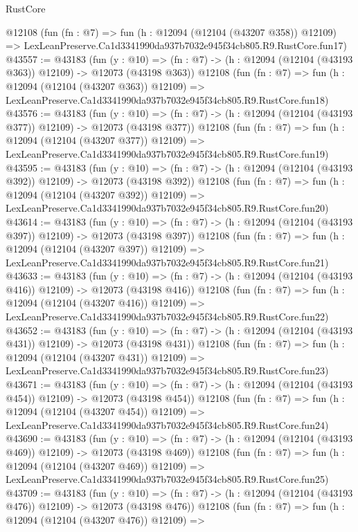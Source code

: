 \begin{lexlean}{RustCore}
\begin{coremodule}
    @12108
    (fun (fn : @7) =>
    fun (h : @12094 (@12104 (@43207 @358)) @12109) =>
    LexLeanPreserve.Ca1d3341990da937b7032e945f34cb805.R9.RustCore.fun17)
@43557 := @43183
    (fun (y : @10) =>
    (fn : @7) -> (h : @12094 (@12104 (@43193 @363)) @12109) -> @12073 (@43198 @363))
    @12108
    (fun (fn : @7) =>
    fun (h : @12094 (@12104 (@43207 @363)) @12109) =>
    LexLeanPreserve.Ca1d3341990da937b7032e945f34cb805.R9.RustCore.fun18)
@43576 := @43183
    (fun (y : @10) =>
    (fn : @7) -> (h : @12094 (@12104 (@43193 @377)) @12109) -> @12073 (@43198 @377))
    @12108
    (fun (fn : @7) =>
    fun (h : @12094 (@12104 (@43207 @377)) @12109) =>
    LexLeanPreserve.Ca1d3341990da937b7032e945f34cb805.R9.RustCore.fun19)
@43595 := @43183
    (fun (y : @10) =>
    (fn : @7) -> (h : @12094 (@12104 (@43193 @392)) @12109) -> @12073 (@43198 @392))
    @12108
    (fun (fn : @7) =>
    fun (h : @12094 (@12104 (@43207 @392)) @12109) =>
    LexLeanPreserve.Ca1d3341990da937b7032e945f34cb805.R9.RustCore.fun20)
@43614 := @43183
    (fun (y : @10) =>
    (fn : @7) -> (h : @12094 (@12104 (@43193 @397)) @12109) -> @12073 (@43198 @397))
    @12108
    (fun (fn : @7) =>
    fun (h : @12094 (@12104 (@43207 @397)) @12109) =>
    LexLeanPreserve.Ca1d3341990da937b7032e945f34cb805.R9.RustCore.fun21)
@43633 := @43183
    (fun (y : @10) =>
    (fn : @7) -> (h : @12094 (@12104 (@43193 @416)) @12109) -> @12073 (@43198 @416))
    @12108
    (fun (fn : @7) =>
    fun (h : @12094 (@12104 (@43207 @416)) @12109) =>
    LexLeanPreserve.Ca1d3341990da937b7032e945f34cb805.R9.RustCore.fun22)
@43652 := @43183
    (fun (y : @10) =>
    (fn : @7) -> (h : @12094 (@12104 (@43193 @431)) @12109) -> @12073 (@43198 @431))
    @12108
    (fun (fn : @7) =>
    fun (h : @12094 (@12104 (@43207 @431)) @12109) =>
    LexLeanPreserve.Ca1d3341990da937b7032e945f34cb805.R9.RustCore.fun23)
@43671 := @43183
    (fun (y : @10) =>
    (fn : @7) -> (h : @12094 (@12104 (@43193 @454)) @12109) -> @12073 (@43198 @454))
    @12108
    (fun (fn : @7) =>
    fun (h : @12094 (@12104 (@43207 @454)) @12109) =>
    LexLeanPreserve.Ca1d3341990da937b7032e945f34cb805.R9.RustCore.fun24)
@43690 := @43183
    (fun (y : @10) =>
    (fn : @7) -> (h : @12094 (@12104 (@43193 @469)) @12109) -> @12073 (@43198 @469))
    @12108
    (fun (fn : @7) =>
    fun (h : @12094 (@12104 (@43207 @469)) @12109) =>
    LexLeanPreserve.Ca1d3341990da937b7032e945f34cb805.R9.RustCore.fun25)
@43709 := @43183
    (fun (y : @10) =>
    (fn : @7) -> (h : @12094 (@12104 (@43193 @476)) @12109) -> @12073 (@43198 @476))
    @12108
    (fun (fn : @7) =>
    fun (h : @12094 (@12104 (@43207 @476)) @12109) =>

\end{coremodule}
\end{lexlean}
